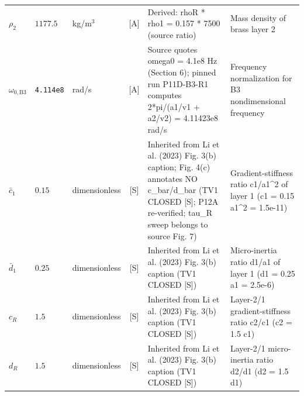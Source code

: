 \begin{xltabular}{\textwidth}{@{}l >{\raggedright\arraybackslash}p{2.2cm} >{\raggedright\arraybackslash}p{2.4cm} c L{2.6cm} Y@{}}
$\rho_2$ & $1177.5$ & kg/m$^3$ & [A] & Derived: rhoR * rho1 = 0.157 * 7500 (source ratio) & Mass density of brass layer 2 \\
$\omega_{0,\mathrm{B3}}$ & \texttt{4.114e8} & rad/s & [A] & Source quotes omega0 = 4.1e8 Hz (Section 6); pinned run P11D-B3-R1 computes 2*pi/(a1/v1 + a2/v2) = 4.11423e8 rad/s & Frequency normalization for B3 nondimensional frequency \\
$\bar{c}_1$ & $0.15$ & dimensionless & [S] & Inherited from Li et al. (2023) Fig. 3(b) caption; Fig. 4(c) annotates NO c\_\hspace{0pt}bar/d\_\hspace{0pt}bar (TV1 CLOSED [S]; P12A re-verified; tau\_\hspace{0pt}R sweep belongs to source Fig. 7) & Gradient-stiffness ratio c1/a1\textasciicircum{}2 of layer 1 (c1 = 0.15 a1\textasciicircum{}2 = 1.5e-11) \\
$\bar{d}_1$ & $0.25$ & dimensionless & [S] & Inherited from Li et al. (2023) Fig. 3(b) caption (TV1 CLOSED [S]) & Micro-inertia ratio d1/a1 of layer 1 (d1 = 0.25 a1 = 2.5e-6) \\
$c_R$ & $1.5$ & dimensionless & [S] & Inherited from Li et al. (2023) Fig. 3(b) caption (TV1 CLOSED [S]) & Layer-2/1 gradient-stiffness ratio c2/c1 (c2 = 1.5 c1) \\
$d_R$ & $1.5$ & dimensionless & [S] & Inherited from Li et al. (2023) Fig. 3(b) caption (TV1 CLOSED [S]) & Layer-2/1 micro-inertia ratio d2/d1 (d2 = 1.5 d1) \\
\end{xltabular}
\endgroup
